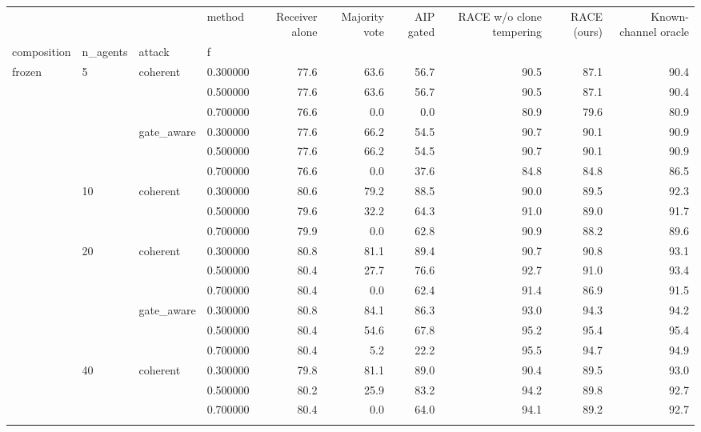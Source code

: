 \begin{tabular}{llllrrrrrr}
\toprule
 &  &  & method & Receiver alone & Majority vote & AIP gated & RACE w/o clone tempering & RACE (ours) & Known-channel oracle \\
composition & n\_agents & attack & f &  &  &  &  &  &  \\
\midrule
\multirow[t]{21}{*}{frozen} & \multirow[t]{6}{*}{5} & \multirow[t]{3}{*}{coherent} & 0.300000 & 77.6 & 63.6 & 56.7 & 90.5 & 87.1 & 90.4 \\
 &  &  & 0.500000 & 77.6 & 63.6 & 56.7 & 90.5 & 87.1 & 90.4 \\
 &  &  & 0.700000 & 76.6 & 0.0 & 0.0 & 80.9 & 79.6 & 80.9 \\
\cline{3-10}
 &  & \multirow[t]{3}{*}{gate\_aware} & 0.300000 & 77.6 & 66.2 & 54.5 & 90.7 & 90.1 & 90.9 \\
 &  &  & 0.500000 & 77.6 & 66.2 & 54.5 & 90.7 & 90.1 & 90.9 \\
 &  &  & 0.700000 & 76.6 & 0.0 & 37.6 & 84.8 & 84.8 & 86.5 \\
\cline{2-10} \cline{3-10}
 & \multirow[t]{3}{*}{10} & \multirow[t]{3}{*}{coherent} & 0.300000 & 80.6 & 79.2 & 88.5 & 90.0 & 89.5 & 92.3 \\
 &  &  & 0.500000 & 79.6 & 32.2 & 64.3 & 91.0 & 89.0 & 91.7 \\
 &  &  & 0.700000 & 79.9 & 0.0 & 62.8 & 90.9 & 88.2 & 89.6 \\
\cline{2-10} \cline{3-10}
 & \multirow[t]{6}{*}{20} & \multirow[t]{3}{*}{coherent} & 0.300000 & 80.8 & 81.1 & 89.4 & 90.7 & 90.8 & 93.1 \\
 &  &  & 0.500000 & 80.4 & 27.7 & 76.6 & 92.7 & 91.0 & 93.4 \\
 &  &  & 0.700000 & 80.4 & 0.0 & 62.4 & 91.4 & 86.9 & 91.5 \\
\cline{3-10}
 &  & \multirow[t]{3}{*}{gate\_aware} & 0.300000 & 80.8 & 84.1 & 86.3 & 93.0 & 94.3 & 94.2 \\
 &  &  & 0.500000 & 80.4 & 54.6 & 67.8 & 95.2 & 95.4 & 95.4 \\
 &  &  & 0.700000 & 80.4 & 5.2 & 22.2 & 95.5 & 94.7 & 94.9 \\
\cline{2-10} \cline{3-10}
 & \multirow[t]{6}{*}{40} & \multirow[t]{3}{*}{coherent} & 0.300000 & 79.8 & 81.1 & 89.0 & 90.4 & 89.5 & 93.0 \\
 &  &  & 0.500000 & 80.2 & 25.9 & 83.2 & 94.2 & 89.8 & 92.7 \\
 &  &  & 0.700000 & 80.4 & 0.0 & 64.0 & 94.1 & 89.2 & 92.7 \\
\cline{3-10}

\end{tabular}
